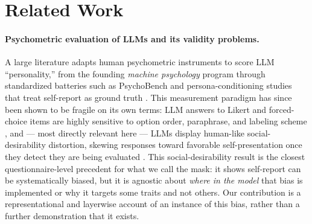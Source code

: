 \section{Related Work}
\label{sec:related-work}

\paragraph{Psychometric evaluation of LLMs and its validity problems.}
A large literature adapts human psychometric instruments to score LLM ``personality,'' from the founding \emph{machine psychology} program \citep{hagendorff2023machinepsych} through standardized batteries such as PsychoBench \citep{huang2024psychobench} and persona-conditioning studies that treat self-report as ground truth \citep{jiang2024personallm,serapiogarcia2023personality}. This measurement paradigm has since been shown to be fragile on its own terms: LLM answers to Likert and forced-choice items are highly sensitive to option order, paraphrase, and labeling scheme \citep{gupta2024selfassessment,rottger2024politicalcompass,dominguezolmedo2024surveys}, and — most directly relevant here — LLMs display human-like social-desirability distortion, skewing responses toward favorable self-presentation once they detect they are being evaluated \citep{salecha2024desirability}. This social-desirability result is the closest questionnaire-level precedent for what we call the mask: it shows self-report can be systematically biased, but it is agnostic about \emph{where in the model} that bias is implemented or why it targets some traits and not others. Our contribution is a representational and layerwise account of an instance of this bias, rather than a further demonstration that it exists.

